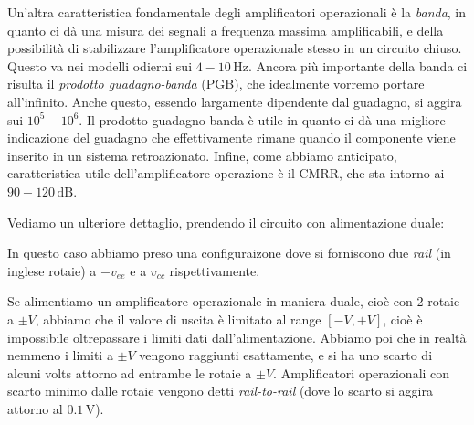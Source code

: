 \documentclass[a4paper,11pt]{article}
\begin{document}
Un'altra caratteristica fondamentale degli amplificatori operazionali è la \textit{banda}, in quanto ci dà una misura dei segnali a frequenza massima amplificabili, e della possibilità di stabilizzare l'amplificatore operazionale stesso in un circuito chiuso. Questo va nei modelli odierni sui $4-10 \, \mathrm{Hz}$.
Ancora più importante della banda ci risulta il \textit{prodotto guadagno-banda} (PGB), che idealmente vorremo portare all'infinito. Anche questo, essendo largamente dipendente dal guadagno, si aggira sui $10^5 - 10^6$. Il prodotto guadagno-banda è utile in quanto ci dà una migliore indicazione del guadagno che effettivamente rimane quando il componente viene inserito in un sistema retroazionato.
Infine, come abbiamo anticipato, caratteristica utile dell'amplificatore operazione è il CMRR, che sta intorno ai $90-120 \, \mathrm{dB}$.

\par\smallskip

Vediamo un ulteriore dettaglio, prendendo il circuito con alimentazione duale:
\begin{center}
\end{center}
In questo caso abbiamo preso una configuraizone dove si forniscono due \textit{rail} (in inglese rotaie) a $-v_{ee}$ e a $v_{cc}$ rispettivamente.

Se alimentiamo un amplificatore operazionale in maniera duale, cioè con 2 rotaie a $\pm V$, abbiamo che il valore di uscita è limitato al range $[-V, +V]$, cioè è impossibile oltrepassare i limiti dati dall'alimentazione. Abbiamo poi che in realtà nemmeno i limiti a $\pm V$ vengono raggiunti esattamente, e si ha uno scarto di alcuni volts attorno ad entrambe le rotaie a $\pm V$. Amplificatori operazionali con scarto minimo dalle rotaie vengono detti \textit{rail-to-rail} (dove lo scarto si aggira attorno al $0.1 \, \mathrm{V}$).
\end{document}
